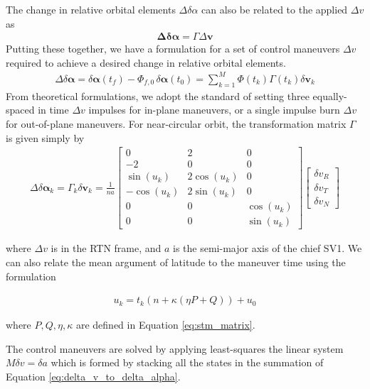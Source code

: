 The change in relative orbital elements $\Delta \delta \alpha$ can also be related to the applied $\Delta v$ as \cite{chernick2021optimal}
\begin{align}
    \boldsymbol{\Delta \delta \alpha} = \Gamma\Delta \boldsymbol{v}
\end{align} \label{eq:delta_v_to_alpha}
Putting these together, we have a formulation for a set of control maneuvers $\Delta v$ required to achieve a desired change in relative orbital elements.
\begin{align}
\Delta \delta \boldsymbol{\alpha} = \delta \boldsymbol{\alpha}(t_f) - \Phi_{f,0} \, \delta \boldsymbol{\alpha}(t_0)
= \sum_{k = 1}^{M} \Phi(t_k) \Gamma (t_k)  \delta \mathbf{v}_k 
\end{align} \label{eq:delta_v_to_delta_alpha}
From theoretical formulations, we adopt the standard of setting three equally-spaced in time $\Delta v$ impulses for in-plane maneuvers, or a single impulse burn $\Delta v$ for out-of-plane maneuvers.
For near-circular orbit, the transformation matrix $\Gamma$ is given simply by
\begin{align}
\Delta \delta \boldsymbol{\alpha}_k = \Gamma_k \delta \mathbf{v}_k = \frac{1}{na}
\begin{bmatrix}
0 & 2 & 0 \\
-2 & 0 & 0 \\
\sin(u_k) & 2\cos(u_k) & 0 \\
-\cos(u_k) & 2\sin(u_k) & 0 \\
0 & 0 & \cos(u_k) \\
0 & 0 & \sin(u_k)
\end{bmatrix}
\begin{bmatrix}
\delta v_R \\
\delta v_T \\
\delta v_N
\end{bmatrix}
\end{align}

where $\Delta v$ is in the RTN frame, and $a$ is the semi-major axis of the chief SV1. We can also relate the mean argument of latitude to the maneuver time using the formulation

\begin{align}
    u_k = t_{k} \left( n + \kappa \left( \eta P + Q \right) \right) + u_{0}
\end{align}

where $P, Q, \eta, \kappa$ are defined in Equation \ref{eq:stm_matrix}.

The control maneuvers are solved by applying least-squares the linear system $M\delta v = \delta a$ which is formed by stacking all the states in the summation of Equation \ref{eq:delta_v_to_delta_alpha}.


